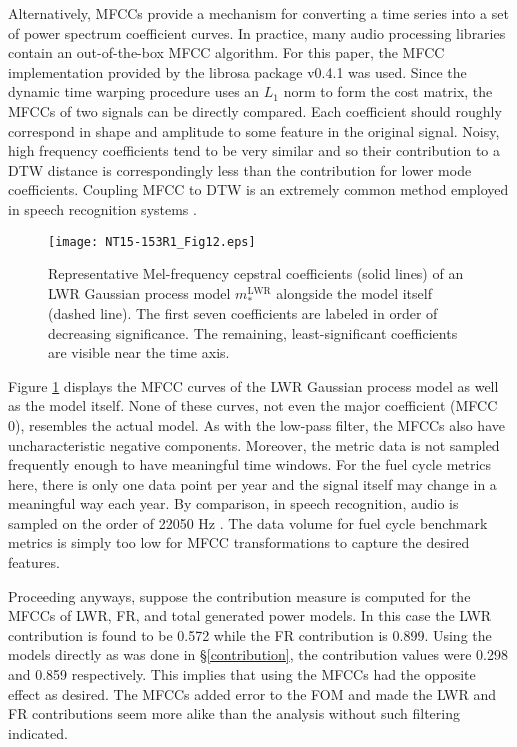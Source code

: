 \documentclass{ntmanuscript}
\newcommand{\LWR}{\mathrm{LWR}}
\begin{document}
Alternatively, MFCCs provide a mechanism for converting a time series into a
set of power spectrum coefficient curves. In practice, many audio processing
libraries contain an out-of-the-box MFCC algorithm. For this paper,
the MFCC implementation provided by the librosa package v0.4.1
\cite{mcfee2015librosa} was used.
Since the dynamic time warping procedure
uses an $L_1$ norm to form the cost matrix, the MFCCs of two signals can be directly
compared. Each coefficient should roughly correspond in shape and amplitude to some
feature in the original signal.  Noisy, high frequency coefficients tend to be
very similar and so their contribution to a DTW distance is correspondingly less
than the contribution for lower mode coefficients. Coupling MFCC to DTW is an
extremely common method employed in speech recognition systems
\cite{muda2010voice,milner2002speech,sato2007emotion}.

\begin{figure}[htb]
\centering
\texttt{[image: NT15-153R1\_Fig12.eps]}
\caption{Representative Mel-frequency cepstral coefficients (solid lines) of
an LWR Gaussian process model $m_*^\LWR$ alongside the model itself (dashed
line). The first seven coefficients are labeled in order of decreasing
significance.  The remaining, least-significant coefficients are visible
near the time axis.}
\label{mfcc-lwr-model}
\end{figure}

Figure \ref{mfcc-lwr-model} displays the MFCC curves of the LWR Gaussian
process model as well as the model itself. None of these curves, not even the
major coefficient (MFCC 0), resembles the actual model.
As with the low-pass filter, the MFCCs also have
uncharacteristic negative components.  Moreover,
the metric data is not sampled frequently enough to have meaningful
time windows. For the fuel cycle metrics here, there is only one data point per year
and the signal itself may change in a meaningful way each year. By comparison,
in speech recognition, audio is sampled on the order of 22050 Hz
\cite{EBUTECH3285,juang1991hidden}.
The data volume for fuel cycle benchmark metrics
is simply too low for MFCC transformations to capture the desired features.

Proceeding anyways, suppose the contribution measure is computed for the MFCCs
of LWR, FR, and
total generated power models.  In this case the LWR contribution is found to be
0.572 while the FR contribution is 0.899. Using the models directly as was done
in \S\ref{contribution}, the contribution values were 0.298 and 0.859 respectively.
This implies that using the MFCCs had the opposite effect as desired.  The MFCCs
added error to the FOM and made the LWR and FR contributions seem more alike
than the analysis without such filtering indicated.
\end{document}
